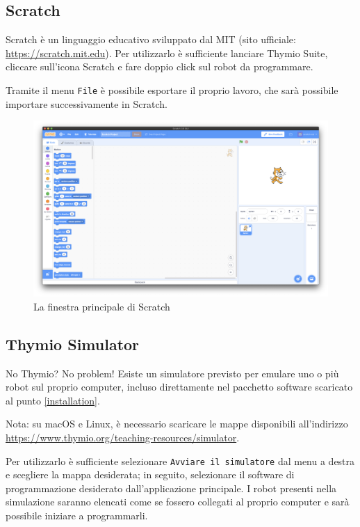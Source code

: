\documentclass[12pt]{article}
\begin{document}
\newpage

\subsection{Scratch}

Scratch è un linguaggio educativo sviluppato dal MIT (sito ufficiale: \url{https://scratch.mit.edu}). Per utilizzarlo è sufficiente lanciare Thymio Suite, cliccare sull'icona Scratch e fare doppio click sul robot da programmare.

Tramite il menu \texttt{File} è possibile esportare il proprio lavoro, che sarà possibile importare successivamente in Scratch.

\begin{figure}[H]
	\includegraphics[width=\textwidth]{img/scratch.png}
	\caption{La finestra principale di Scratch}
	\label{main_scratch}
\end{figure}

\subsection{Thymio Simulator}

No Thymio? No problem! Esiste un simulatore previsto per emulare uno o più robot sul proprio computer, incluso direttamente nel pacchetto software scaricato al punto \ref{installation}.

Nota: su macOS e Linux, è necessario scaricare le mappe disponibili all'indirizzo \url{https://www.thymio.org/teaching-resources/simulator}.

Per utilizzarlo è sufficiente selezionare \texttt{Avviare il simulatore} dal menu a destra e scegliere la mappa desiderata; in seguito, selezionare il software di programmazione desiderato dall'applicazione principale.
I robot presenti nella simulazione saranno elencati come se fossero collegati al proprio computer e sarà possibile iniziare a programmarli.
\end{document}
